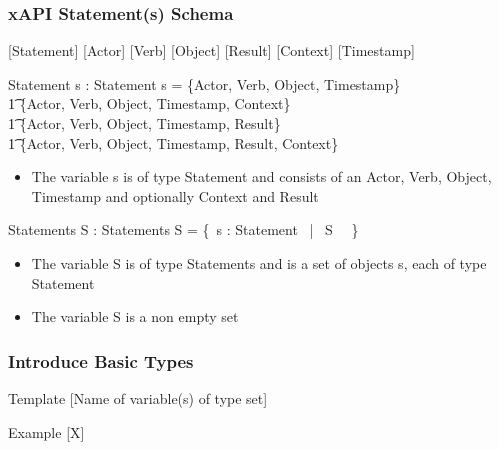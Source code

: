 \documentclass{article}
\begin{document}
\subsubsection{xAPI Statement(s) Schema}
[Statement]
[Actor]
[Verb]
[Object]
[Result]
[Context]
[Timestamp]
\begin{schema}{Statement}
  s : Statement
  \where
  s = \{Actor, Verb, Object, Timestamp\} \, \lor
  \\ \t1 \{Actor, Verb, Object, Timestamp, Context\} \, \lor
  \\ \t1 \{Actor, Verb, Object, Timestamp, Result\} \, \lor
  \\ \t1 \{Actor, Verb, Object, Timestamp, Result, Context\}
\end{schema}
\begin{itemize}
\item The variable s is of type Statement and consists of an Actor, Verb, Object, Timestamp and optionally Context and Result
\end{itemize}
\begin{schema}{Statements}
  S : Statements
  \where
  S = \{~s : Statement \, | \, S \, \neg \, \emptyset\} \\
\end{schema}
\begin{itemize}
\item The variable S is of type Statements and is a set of objects s, each of type Statement
\item The variable S is a non empty set
\end{itemize}
\subsubsection{Introduce Basic Types}
\begin{paragraph}{Template}
  [Name of variable(s) of type set]
\end{paragraph}
\begin{paragraph}{Example}
  [X]
\end{paragraph}
\end{document}
